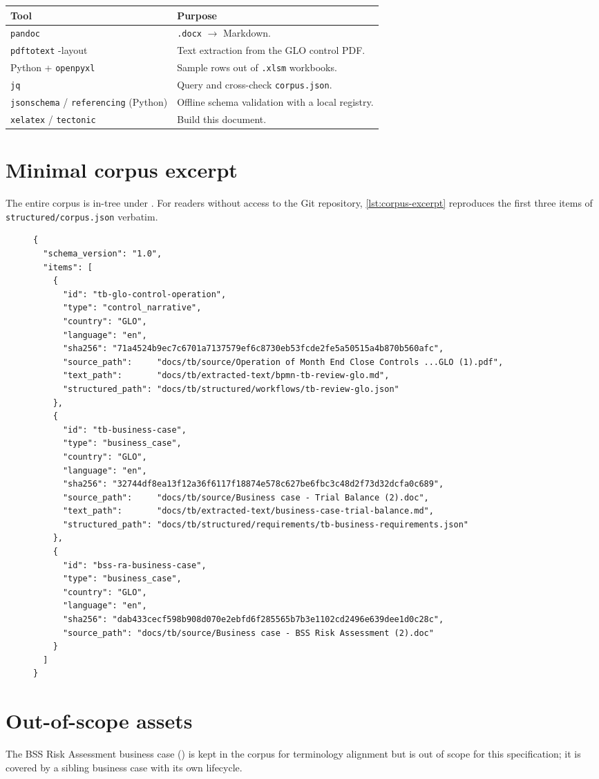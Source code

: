 \begin{tabularx}{\linewidth}{@{}l X@{}}
\toprule
\textbf{Tool} & \textbf{Purpose} \\ \midrule
\texttt{pandoc}   & \texttt{.docx} $\to$ Markdown. \\
\texttt{pdftotext} -layout & Text extraction from the GLO control PDF. \\
Python + \texttt{openpyxl} & Sample rows out of \texttt{.xlsm} workbooks. \\
\texttt{jq} & Query and cross-check \texttt{corpus.json}. \\
\texttt{jsonschema} / \texttt{referencing} (Python) & Offline schema validation with a local registry. \\
\texttt{xelatex} / \texttt{tectonic} & Build this document. \\
\bottomrule
\end{tabularx}

\section{Minimal corpus excerpt}

The entire corpus is in-tree under \corpus. For readers without access
to the Git repository, \cref{lst:corpus-excerpt} reproduces the first
three items of \corpus\texttt{structured/corpus.json} verbatim.

\begin{figure}[htbp]
\begin{lstlisting}[language=jsonx,caption={First three items of
\texttt{corpus.json}; identical SHA-256 values are reproduced in
the table above.},label=lst:corpus-excerpt]
{
  "schema_version": "1.0",
  "items": [
    {
      "id": "tb-glo-control-operation",
      "type": "control_narrative",
      "country": "GLO",
      "language": "en",
      "sha256": "71a4524b9ec7c6701a7137579ef6c8730eb53fcde2fe5a50515a4b870b560afc",
      "source_path":     "docs/tb/source/Operation of Month End Close Controls ...GLO (1).pdf",
      "text_path":       "docs/tb/extracted-text/bpmn-tb-review-glo.md",
      "structured_path": "docs/tb/structured/workflows/tb-review-glo.json"
    },
    {
      "id": "tb-business-case",
      "type": "business_case",
      "country": "GLO",
      "language": "en",
      "sha256": "32744df8ea13f12a36f6117f18874e578c627be6fbc3c48d2f73d32dcfa0c689",
      "source_path":     "docs/tb/source/Business case - Trial Balance (2).doc",
      "text_path":       "docs/tb/extracted-text/business-case-trial-balance.md",
      "structured_path": "docs/tb/structured/requirements/tb-business-requirements.json"
    },
    {
      "id": "bss-ra-business-case",
      "type": "business_case",
      "country": "GLO",
      "language": "en",
      "sha256": "dab433cecf598b908d070e2ebfd6f285565b7b3e1102cd2496e639dee1d0c28c",
      "source_path": "docs/tb/source/Business case - BSS Risk Assessment (2).doc"
    }
  ]
}
\end{lstlisting}
\end{figure}

\section{Out-of-scope assets}

The BSS Risk Assessment business case
()
is kept in the corpus for terminology alignment but is out of scope
for this specification; it is covered by a sibling business case with
its own lifecycle.
